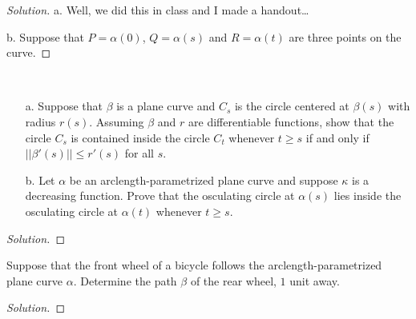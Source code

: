 \documentclass[Shifrin_Solutions_Spring_2018]{subfiles}
\begin{document}
\begin{proof}[Solution]
\item[a.] Well, we did this in class and I made a handout\dots

\item[b.] Suppose that $P = \alpha(0)$, $Q= \alpha(s)$ and $R=\alpha(t)$ are three 
points on the curve.

\end{proof}

\vspace{.5cm}


\begin{exercise}$\ $\\
\begin{itemize}
\item[a.] Suppose that $\beta$ is a plane curve and $C_s$ is the circle centered 
at $\beta(s)$ with radius $r(s)$. Assuming $\beta$ and $r$ are differentiable 
functions, show that the circle $C_s$ is contained inside the circle $C_t$ whenever 
$t\geq s$ if and only if $||\beta'(s)|| \leq r'(s)$ for all $s$.
\item[b.] Let $\alpha$ be an arclength-parametrized plane curve and suppose $\kappa$ 
is a decreasing function. Prove that the osculating circle at $\alpha(s)$ lies inside 
the osculating circle at $\alpha(t)$ whenever $t\geq s$.
\end{itemize}
\end{exercise}

\begin{proof}[Solution]

\end{proof}

\vspace{.5cm}


\begin{exercise}
Suppose that the front wheel of a bicycle follows the arclength-parametrized plane 
curve $\alpha$. Determine the path $\beta$ of the rear wheel, $1$ unit away.
\end{exercise}

\begin{proof}[Solution]

\end{proof}

\vspace{.5cm}

\end{document}
